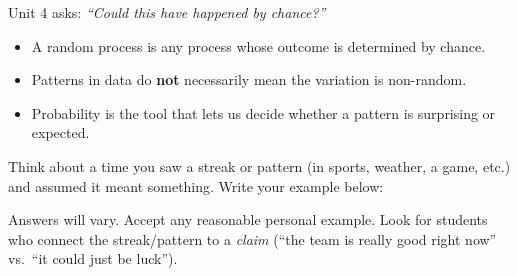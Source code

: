 \documentclass[10pt]{article}
\begin{document}
\vspace{0.12in}

\noindent Unit 4 asks: \textit{``Could this have happened by chance?''}

\vspace{0.14in}

\begin{tcolorbox}[colback=greenbg, colframe=greenacc, boxrule=0.8pt, arc=2mm,
    left=4mm, right=4mm, top=3mm, bottom=3mm]
    \small
    \begin{itemize}[leftmargin=1.3em, itemsep=8pt]
  \item A random process is any process whose outcome is determined by chance.
  \item Patterns in data do \textbf{not} necessarily mean the variation is non-random.
  \item Probability is the tool that lets us decide whether a pattern is surprising or expected.
    \end{itemize}
\end{tcolorbox}

\vspace{0.2in}

\noindent\textcolor{slate}{\small Think about a time you saw a streak or pattern (in sports, weather,
a game, etc.) and assumed it meant something. Write your example below:}\\[8pt]
\begin{teachernote}
Answers will vary. Accept any reasonable personal example. Look for students who connect the streak/pattern to a \emph{claim} (``the team is really good right now'' vs.\ ``it could just be luck'').
\end{teachernote}
\end{document}
